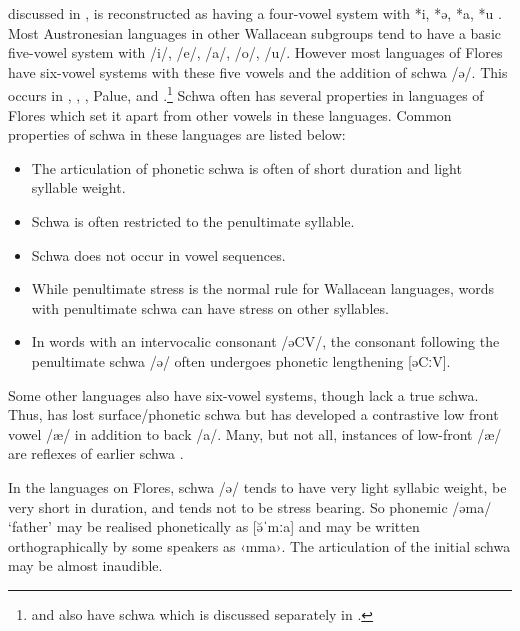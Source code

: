  discussed in ,
 is reconstructed as having a four-vowel system with
*i, *ə, *a, *u \citep[173]{Blust2013}.
Most Austronesian languages in other Wallacean subgroups tend
to have a basic five-vowel system with /i/,
/e/, /a/, /o/, /u/.
However most languages of Flores have six-vowel systems
with these five vowels and the addition of schwa /ə/.
This occurs in  \citep{VerheijenGrimes1995},
 \citep{DjawanaiGrimes1995},  \citep{Elias2018},
Palu{\Q}e, and  \citep{LewisGrimes1995}.\footnote{
		 and  also have schwa which is discussed separately in .}
Schwa often has several properties in languages of Flores
which set it apart from other vowels in these languages.
Common properties of schwa in these languages are listed below:

\begin{itemize}
	\item The articulation of phonetic schwa is often of short duration and light syllable weight.
	\item Schwa is often restricted to the penultimate syllable.
	\item Schwa does not occur in vowel sequences.
	\item While penultimate stress is the normal rule for Wallacean languages,
				words with penultimate schwa can have stress on other syllables.
	\item In words with an intervocalic consonant /əCV/,
				the consonant following the penultimate schwa
				/ə/ often undergoes phonetic lengthening [əCːV].
\end{itemize}

Some other  languages also have six-vowel systems,
though lack a true schwa.
Thus,  has lost surface/phonetic schwa but has developed
a contrastive low front vowel /æ/ in addition to back /a/.
Many, but not all, instances of low-front /æ/ are reflexes of
earlier schwa \citep[211ff]{Fricke2019}.

In the languages on Flores,
schwa /ə/ tends to have very light syllabic weight,
be very short in duration,
and tends not to be stress bearing.
So phonemic /əma/ ‘father’ may be realised phonetically as [ə̆ˈmːa]
and may be written orthographically by some speakers as ‹mma›.
The articulation of the initial schwa may be almost inaudible.

